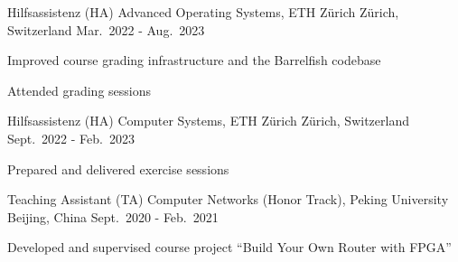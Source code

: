 \begin{cventries}
    \cventry
    {Hilfsassistenz (HA)}
    {Advanced Operating Systems, ETH Z\"urich}
    {Z\"urich, Switzerland}
    {Mar.\ 2022 - Aug.\ 2023}
    {\begin{cvitems}
    \item Improved course grading infrastructure and the Barrelfish codebase
    \item Attended grading sessions
    \end{cvitems}}

    \cventry
    {Hilfsassistenz (HA)}
    {Computer Systems, ETH Z\"urich}
    {Z\"urich, Switzerland}
    {Sept.\ 2022 - Feb.\ 2023}
    {\begin{cvitems}
    \item Prepared and delivered exercise sessions
    \end{cvitems}}

    \cventry
    {Teaching Assistant (TA)}
    {Computer Networks (Honor Track), Peking University}
    {Beijing, China}
    {Sept.\ 2020 - Feb.\ 2021}
    {\begin{cvitems}
    \item Developed and supervised course project ``Build Your Own Router with FPGA''
    \end{cvitems}}
\end{cventries}
